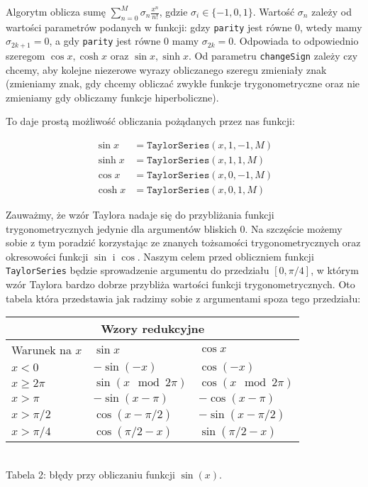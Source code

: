 \documentclass[12pt]{extarticle}
\theoremstyle{remark}
\theoremstyle{definition}
\theoremstyle{definition}
\begin{document}
Algorytm oblicza sumę $\sum_{n=0}^M\sigma_n\frac{x^n}{n!}$, gdzie $\sigma_i \in \{-1, 0, 1\}$. Wartość $\sigma_n$ zależy od wartości parametrów podanych w funkcji: gdzy \texttt{parity} jest równe $0$, wtedy mamy $\sigma_{2k + 1} = 0$, a gdy \texttt{parity} jest równe $0$ mamy $\sigma_{2k} = 0$. Odpowiada to odpowiednio szeregom $\cos x, \cosh x$ oraz $\sin x, \sinh x$. Od parametru \texttt{changeSign} zależy czy chcemy, aby kolejne niezerowe wyrazy obliczanego szeregu zmieniały znak (zmieniamy znak, gdy chcemy obliczać zwykłe funkcje trygonometryczne oraz nie zmieniamy gdy obliczamy funkcje hiperboliczne). 

To daje prostą możliwość obliczania pożądanych przez nas funkcji:

\begin{align*}
  \sin x  & = \texttt{TaylorSeries}(x, 1, -1, M) \\
  \sinh x & = \texttt{TaylorSeries}(x, 1, 1, M)  \\
  \cos x  & = \texttt{TaylorSeries}(x, 0, -1, M) \\
  \cosh x & = \texttt{TaylorSeries}(x, 0, 1, M)
\end{align*}

Zauważmy, że wzór Taylora nadaje się do przybliżania funkcji trygonometrycznych jedynie dla argumentów bliskich $0$. Na szczęście możemy sobie z tym poradzić korzystając ze znanych tożsamości trygonometrycznych oraz okresowości funkcji $\sin$ i $\cos$. Naszym celem przed obliczniem funkcji \texttt{TaylorSeries} będzie sprowadzenie argumentu do przedziału $[0, \pi/4]$, w którym wzór Taylora bardzo dobrze przybliża wartości funkcji trygonometrycznych. Oto tabela która przedstawia jak radzimy sobie z argumentami spoza tego przedziału:
\begin{center}
  \begin{tabular}{ |p{4cm}||p{4cm}|p{4cm}| }
    \hline
    \multicolumn{3}{|c|}{Wzory redukcyjne}                     \\
    \hline
    Warunek na $x$ & $\sin x$            & $\cos x$            \\
    \hline
    $x < 0$        & $-\sin (-x)$        & $\cos (-x)$         \\
    $x \ge 2\pi$   & $\sin(x \mod 2\pi)$ & $\cos (x\mod 2\pi)$ \\
    $x > \pi$      & $-\sin(x - \pi)$    & $-\cos(x - \pi)$    \\
    $x > \pi/2$    & $\cos(x - \pi/2)$   & $-\sin(x - \pi/2)$  \\
    $x > \pi/4$    & $\cos(\pi/2 - x)$   & $\sin(\pi/2 - x)$   \\
    \hline
  \end{tabular}
  \\
\vspace{0.5cm}
Tabela 2: błędy przy obliczaniu funkcji $\sin(x)$.
\end{center}
\end{document}
